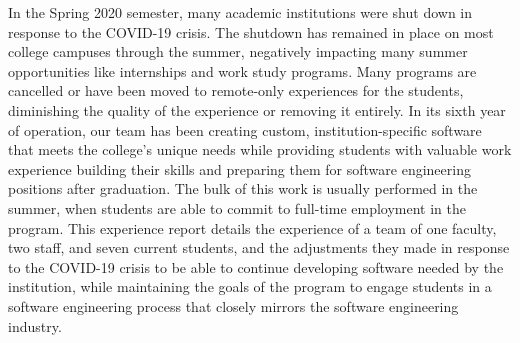In the Spring 2020 semester, many academic institutions were shut down in response to the COVID-19 crisis.
The shutdown has remained in place on most college campuses through the summer, negatively impacting many summer opportunities like internships and work study programs. Many programs are cancelled or have been moved to remote-only experiences for the students, diminishing the quality of the experience or removing it entirely. In its sixth year of operation, our team has been creating custom, institution-specific software that meets the college's unique needs while providing students with valuable work experience building their skills and preparing them for software engineering positions after graduation. The bulk of this work is usually performed in the summer, when students are able to commit to full-time employment in the program. This experience report details the experience of a team of one faculty, two staff, and seven current students, and the adjustments they made in response to the COVID-19 crisis to be able to continue developing software needed by the institution, while maintaining the goals of the program to engage students in a software engineering process that closely mirrors the software engineering industry.




